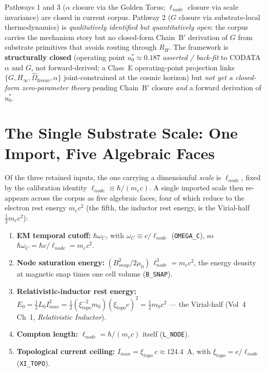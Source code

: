 Pathways 1 and 3 ($\alpha$ closure via the Golden Torus; $\ell_{node}$ closure via scale invariance) are closed in current corpus. Pathway 2 ($G$ closure via substrate-local thermodynamics) is \emph{qualitatively identified but quantitatively open}: the corpus carries the mechanism story but no closed-form Chain~B$'$ derivation of $G$ from substrate primitives that avoids routing through $R_H$.
The framework is \textbf{structurally closed} (operating point $u_0^* \approx 0.187$ \emph{asserted / back-fit} to CODATA $\alpha$ and $G$, not forward-derived; a Class~E operating-point projection links $\{G, H_\infty, \hat{\Omega}_{\text{freeze}}, \alpha\}$ joint-constrained at the cosmic horizon) but \emph{not yet a closed-form zero-parameter theory} pending Chain~B$'$ closure \emph{and} a forward derivation of $u_0^*$.

\section{The Single Substrate Scale: One Import, Five Algebraic Faces}
\label{sec:single_substrate_scale}
Of the three retained inputs, the one carrying a dimensionful \emph{scale} is $\ell_{node}$, fixed by the calibration identity $\ell_{node}\equiv\hbar/(m_e c)$. A single imported scale then re-appears across the corpus as five algebraic faces, four of which reduce to the electron rest energy $m_e c^2$ (the fifth, the inductor rest energy, is the Virial-half $\tfrac12 m_e c^2$):

\begin{enumerate}
    \item \textbf{EM temporal cutoff:} $\hbar\omega_C$, with $\omega_C \equiv c/\ell_{node}$ (\texttt{OMEGA\_C}), so $\hbar\omega_C = \hbar c/\ell_{node} = m_e c^2$.
    \item \textbf{Node saturation energy:} $(B_{snap}^2/2\mu_0)\,\ell_{node}^3 = m_e c^2$, the energy density at magnetic snap times one cell volume (\texttt{B\_SNAP}).
    \item \textbf{Relativistic-inductor rest energy:} $E_0 = \tfrac12 L_0 I_{max}^2 = \tfrac12(\xi_{topo}^{-2}m_0)(\xi_{topo}c)^2 = \tfrac12 m_0 c^2$ --- the Virial-half (Vol~4 Ch~1, \emph{Relativistic Inductor}).
    \item \textbf{Compton length:} $\ell_{node} = \hbar/(m_e c)$ itself (\texttt{L\_NODE}).
    \item \textbf{Topological current ceiling:} $I_{max} = \xi_{topo}\,c \approx 124.4$~A, with $\xi_{topo} = e/\ell_{node}$ (\texttt{XI\_TOPO}).
\end{enumerate}

